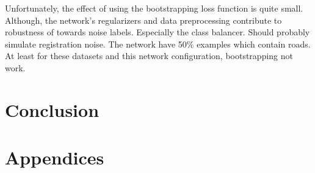\documentclass[a4paper]{book}
\begin{document}
Unfortunately, the effect of using the bootstrapping loss function is quite small. Although, the network's regularizers and data preprocessing contribute to robustness of towards noise labels. Especially the class balancer. Should probably simulate registration noise. The network have 50\% examples which contain roads. At least for these datasets and this network configuration, bootstrapping not work.
\chapter{Conclusion}
\label{cha:evaluationAndConclusion}







\backmatter


\appendix
\chapter*{Appendices}
\renewcommand{\thesection}{\Alph{section}}




\end{document}
